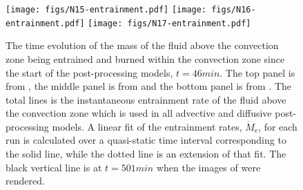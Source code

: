 \documentclass[fleqn,usenatbib]{mnras}
\newcommand{\cldfluid}{fluid above the convection zone}
\begin{document}
\begin{figure}

    \texttt{[image: figs/N15-entrainment.pdf]}
    \texttt{[image: figs/N16-entrainment.pdf]}
    \texttt{[image: figs/N17-entrainment.pdf]}

  \centering
  \caption{The time evolution of the mass of the \cldfluid{} being
          entrained and burned within the convection zone since the start of the \mppnp{}
          post-processing models, $t = \unit{46}{min}$. The top panel is from ,
          the middle panel is from  and the bottom panel is from . The
          total lines is the instantaneous entrainment rate of the \cldfluid{} which
          is used in all advective and diffusive post-processing models. A linear fit of
          the entrainment rates, $\dot{M}_{\mathrm{e}}$, for each run is calculated over a
          quasi-static time interval corresponding to the solid line, while the dotted line
          is an extension of that fit. The black vertical line is at $t = \unit{501}{min}$
          when the images of  were rendered.}
  \label{fig:entrain}

\end{figure}
\end{document}
